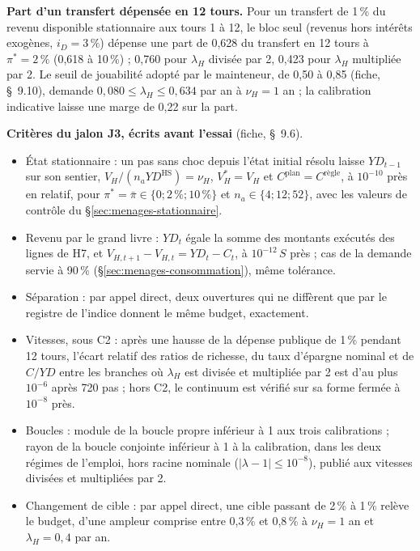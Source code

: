 \documentclass[11pt,a4paper]{article}
\begin{document}
\begin{proposee}
\textbf{Part d'un transfert dépensée en 12 tours.} Pour un transfert de 1\,\% du revenu disponible stationnaire aux tours 1 à 12, le bloc seul (revenus hors intérêts exogènes, $i_D = 3\,\%$) dépense une part de 0,628 du transfert en 12 tours à $\pi^\ast = 2\,\%$ (0,618 à 10\,\%) ; 0,760 pour $\lambda_H$ divisée par 2, 0,423 pour $\lambda_H$ multipliée par 2. Le seuil de jouabilité adopté par le mainteneur, de 0,50 à 0,85 (fiche, \S~9.10), demande $0{,}080 \le \lambda_H \le 0{,}634$ par an à $\nu_H = 1$ an ; la calibration indicative laisse une marge de 0,22 sur la part.

\textbf{Critères du jalon J3, écrits avant l'essai} (fiche, \S~9.6).
\begin{itemize}
\item État stationnaire : un pas sans choc depuis l'état initial résolu laisse $\mathit{YD}_{t-1}$ sur son sentier, $V_H/(n_a\mathit{YD}^{\mathrm{HS}}) = \nu_H$, $V^\ast_H = V_H$ et $C^{\mathrm{plan}} = C^{\text{règle}}$, à $10^{-10}$ près en relatif, pour $\pi^\ast = \bar\pi \in \{0 ; 2\,\% ; 10\,\%\}$ et $n_a \in \{4 ; 12 ; 52\}$, avec les valeurs de contrôle du \S\ref{sec:menages-stationnaire}.
\item Revenu par le grand livre : $\mathit{YD}_t$ égale la somme des montants exécutés des lignes de H7, et $V_{H,t+1} - V_{H,t} = \mathit{YD}_t - C_t$, à $10^{-12}\,S$ près ; cas de la demande servie à 90\,\% (\S\ref{sec:menages-consommation}), même tolérance.
\item Séparation : par appel direct, deux ouvertures qui ne diffèrent que par le registre de l'indice donnent le même budget, exactement.
\item Vitesses, sous C2 : après une hausse de la dépense publique de 1\,\% pendant 12 tours, l'écart relatif des ratios de richesse, du taux d'épargne nominal et de $C/\mathit{YD}$ entre les branches où $\lambda_H$ est divisée et multipliée par 2 est d'au plus $10^{-6}$ après 720 pas ; hors C2, le continuum est vérifié sur sa forme fermée à $10^{-8}$ près.
\item Boucles : module de la boucle propre inférieur à 1 aux trois calibrations ; rayon de la boucle conjointe inférieur à 1 à la calibration, dans les deux régimes de l'emploi, hors racine nominale ($|\lambda - 1| \le 10^{-8}$), publié aux vitesses divisées et multipliées par 2.
\item Changement de cible : par appel direct, une cible passant de 2\,\% à 1\,\% relève le budget, d'une ampleur comprise entre 0,3\,\% et 0,8\,\% à $\nu_H = 1$ an et $\lambda_H = 0{,}4$ par an.

\end{itemize}
\end{proposee}
\end{document}
